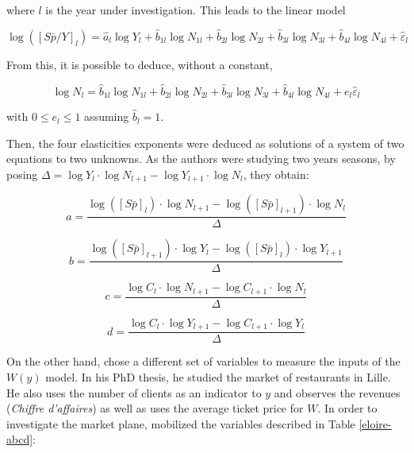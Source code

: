 \documentclass[a4paper, 12pt, openright, oneside, german, french, brazil, english, article]{abntex2}
\begin{document}
	where $l$ is the year under investigation. This leads to the linear model
	
	\begin{equation}
	\label{regression}
		\log([S\bar{p}/Y]_l) = \hat{a}_l \log Y_l + \hat{b}_{1l} \log N_{1l} + \hat{b}_{2l} \log N_{2l} + \hat{b}_{3l} \log N_{3l} + \hat{b}_{4l} \log N_{4l} + \hat{\varepsilon}_l
	\end{equation}
	
	From this, it is possible to deduce, without a constant,
	
	\begin{equation}
	\label{N-com-pesos}
		\log N_l = \hat{b}_{1l} \log N_{1l} + \hat{b}_{2l} \log N_{2l} + \hat{b}_{3l} \log N_{3l} + \hat{b}_{4l} \log N_{4l} + e_l \hat{\varepsilon}_l
	\end{equation}
	
	with $0 \le e_l \le 1$ assuming $\hat{b}_l = 1$.
	
	Then, the four elasticities exponents were deduced as solutions of a system of two equations to two unknowns. As the authors were studying two years seasons, by posing $\Delta = \log Y_l \cdot \log N_{l+1} - \log Y_{l+1} \cdot \log N_l$, they obtain:
	
	$$ a = \frac{ \log([S\bar{p}]_l) \cdot \log N_{l+1} - \log([S\bar{p}]_{l+1}) \cdot \log N_{l} }{\Delta} $$
	
	$$ b = \frac{ \log([S\bar{p}]_{l+1}) \cdot \log Y_{l} - \log([S\bar{p}]_{l}) \cdot \log Y_{l+1} }{\Delta} $$
	
	$$ c = \frac{ \log C_l \cdot \log N_{l+1} - \log C_{l+1} \cdot \log N_{l} }{\Delta} $$
	
	\begin{equation}
	\label{parameters}
		d = \frac{ \log C_l \cdot \log Y_{l+1} - \log C_{l+1} \cdot \log Y_{l} }{\Delta}
	\end{equation}
	




	On the other hand,  chose a different set of variables to measure the inputs of the $W(y)$ model. In his PhD thesis, he studied the market of restaurants in Lille. He also uses the number of clients as an indicator to $y$ and observes the revenues (\textit{Chiffre d'affaires}) as well as uses the average ticket price for $W$. In order to investigate the market plane,  mobilized the variables described in Table \ref{eloire-abcd}:
\end{document}
